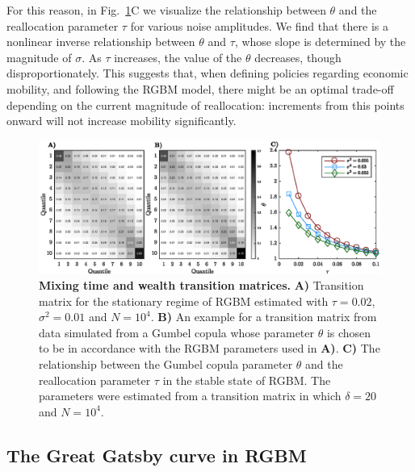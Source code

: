 \documentclass[11pt]{article}
\newcommand{\fref}[1]{Fig.~\ref{fig:#1}}
\numberwithin{equation}{section}
\begin{document}
For this reason, in \fref{rgbm-wealth-matrices}C we visualize the relationship between $\theta$ and the reallocation parameter $\tau$ for various noise amplitudes. We find that there is a nonlinear inverse relationship between $\theta$ and $\tau$, whose slope is determined by the magnitude of $\sigma$. As $\tau$ increases, the value of the $\theta$ decreases, though disproportionately. This suggests that, when defining policies regarding economic mobility, and following the RGBM model, there might be an optimal trade-off depending on the current magnitude of reallocation: increments from this points onward will not increase mobility significantly. 

\begin{figure}[!htb]
\centering
\includegraphics[width=1.0\textwidth]{figs/fig_rgbm_gumbel.eps}
\caption{\textbf{Mixing time and wealth transition matrices.} \textbf{A)} Transition matrix for the stationary regime of RGBM estimated with $\tau = 0.02$, $\sigma^2 = 0.01$ and $N = 10^4$. \textbf{B)} An example for a transition matrix from data simulated from a Gumbel copula whose parameter $\theta$ is chosen to be in accordance with the RGBM parameters used in \textbf{A)}. \textbf{C)} The relationship between the Gumbel copula parameter $\theta$ and the reallocation parameter $\tau$ in the stable state of RGBM. The parameters were estimated from a transition matrix in which $\delta = 20$ and $N = 10^4$. %
\label{fig:rgbm-wealth-matrices}}
\end{figure}
\FloatBarrier

\subsection{The Great Gatsby curve in RGBM}
\end{document}
